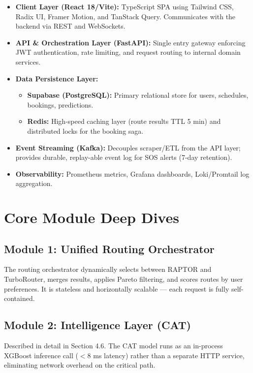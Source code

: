 \documentclass[12pt,a4paper]{report}
\begin{document}
\begin{itemize}[leftmargin=1.5em]
  \item \textbf{Client Layer (React 18/Vite):} TypeScript SPA using Tailwind CSS, Radix UI, Framer Motion, and TanStack Query. Communicates with the backend via REST and WebSockets.
  \item \textbf{API \& Orchestration Layer (FastAPI):} Single entry gateway enforcing JWT authentication, rate limiting, and request routing to internal domain services.
  \item \textbf{Data Persistence Layer:}
    \begin{itemize}
      \item \textbf{Supabase (PostgreSQL):} Primary relational store for users, schedules, bookings, predictions.
      \item \textbf{Redis:} High-speed caching layer (route results TTL 5 min) and distributed locks for the booking saga.
    \end{itemize}
  \item \textbf{Event Streaming (Kafka):} Decouples scraper/ETL from the API layer; provides durable, replay-able event log for SOS alerts (7-day retention).
  \item \textbf{Observability:} Prometheus metrics, Grafana dashboards, Loki/Promtail log aggregation.
\end{itemize}

\section{Core Module Deep Dives}

\subsection{Module 1: Unified Routing Orchestrator}

The routing orchestrator dynamically selects between RAPTOR and TurboRouter, merges results, applies Pareto filtering, and scores routes by user preferences. It is stateless and horizontally scalable --- each request is fully self-contained.

\subsection{Module 2: Intelligence Layer (CAT)}

Described in detail in Section 4.6. The CAT model runs as an in-process XGBoost inference call ($<$8 ms latency) rather than a separate HTTP service, eliminating network overhead on the critical path.
\end{document}
